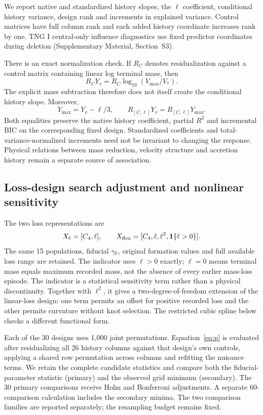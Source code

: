 \documentclass[11pt,a4paper]{article}
\begin{document}
We report native and standardized history slopes, the $\ell$ coefficient, conditional history variance, design rank and increments in explained variance. Control matrices have full column rank and each added history coordinate increases rank by one. TNG I central-only influence diagnostics use fixed predictor coordinates during deletion (Supplementary Material, Section~S3).

There is an exact normalization check. If $R_C$ denotes residualization against a control matrix containing linear log terminal mass, then
\begin{equation}
R_CY_v=R_C\log_{10}(V_{\max}/V_*).
\end{equation}
The explicit mass subtraction therefore does not itself create the conditional history slope. Moreover,
\begin{equation}
Y_{\max}=Y_v-\ell/3,\qquad R_{[C,\ell]}Y_v=R_{[C,\ell]}Y_{\max}.\label{eq:normalization_check}
\end{equation}
Both equalities preserve the native history coefficient, partial $R^2$ and incremental BIC on the corresponding fixed design. Standardized coefficients and total-variance-normalized increments need not be invariant to changing the response. Physical relations between mass reduction, velocity structure and accretion history remain a separate source of association.

\subsection{Loss-design search adjustment and nonlinear sensitivity}\label{sec:loss_search}
The two loss representations are
\begin{equation}
X_\ell=[C_4,\ell],\qquad X_{\rm flex}=[C_4,\ell,\ell^2,\mathbf{1}\{\ell>0\}].
\end{equation}
The same 15 populations, fiducial $\gamma_{\rm f}$, original formation values and full available loss range are retained. The indicator uses $\ell>0$ exactly; $\ell=0$ means terminal mass equals maximum recorded mass, not the absence of every earlier mass-loss episode. The indicator is a statistical sensitivity term rather than a physical discontinuity. Together with $\ell^2$, it gives a two-degree-of-freedom extension of the linear-loss design: one term permits an offset for positive recorded loss and the other permits curvature without knot selection. The restricted cubic spline below checks a different functional form.

Each of the 30 designs uses 1,000 joint permutations. Equation~\eqref{eq:p} is evaluated after residualizing all 26 history columns against that design's own controls, applying a shared row permutation across columns and refitting the nuisance terms. We retain the complete candidate statistics and compare both the fiducial-parameter statistic (primary) and the observed grid minimum (secondary). The 30 primary comparisons receive Holm and Bonferroni adjustments. A separate 60-comparison calculation includes the secondary minima. The two comparison families are reported separately; the resampling budget remains fixed.
\end{document}
